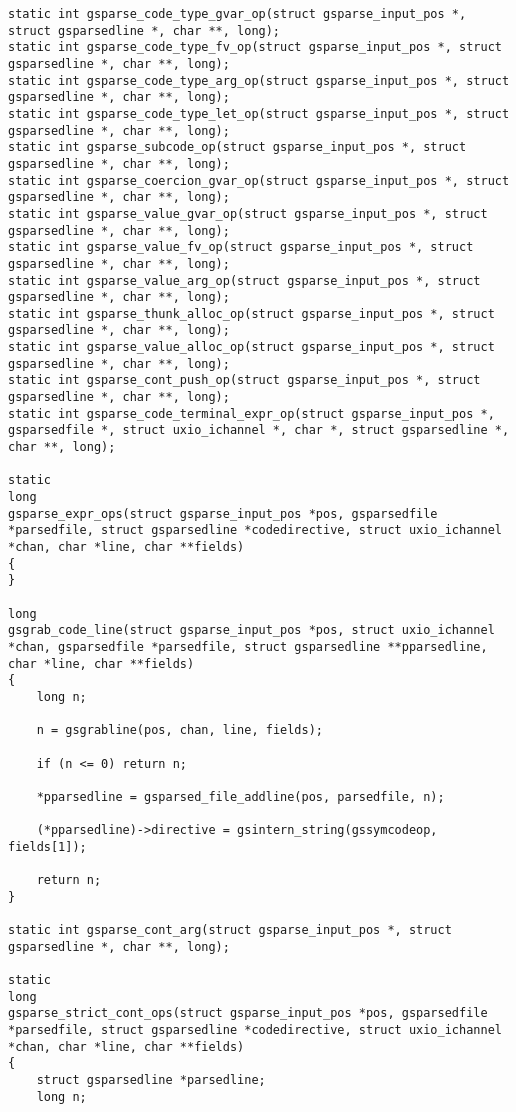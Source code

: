 \documentclass{report}
\begin{document}
\begin{verbatim}
static int gsparse_code_type_gvar_op(struct gsparse_input_pos *, struct gsparsedline *, char **, long);
static int gsparse_code_type_fv_op(struct gsparse_input_pos *, struct gsparsedline *, char **, long);
static int gsparse_code_type_arg_op(struct gsparse_input_pos *, struct gsparsedline *, char **, long);
static int gsparse_code_type_let_op(struct gsparse_input_pos *, struct gsparsedline *, char **, long);
static int gsparse_subcode_op(struct gsparse_input_pos *, struct gsparsedline *, char **, long);
static int gsparse_coercion_gvar_op(struct gsparse_input_pos *, struct gsparsedline *, char **, long);
static int gsparse_value_gvar_op(struct gsparse_input_pos *, struct gsparsedline *, char **, long);
static int gsparse_value_fv_op(struct gsparse_input_pos *, struct gsparsedline *, char **, long);
static int gsparse_value_arg_op(struct gsparse_input_pos *, struct gsparsedline *, char **, long);
static int gsparse_thunk_alloc_op(struct gsparse_input_pos *, struct gsparsedline *, char **, long);
static int gsparse_value_alloc_op(struct gsparse_input_pos *, struct gsparsedline *, char **, long);
static int gsparse_cont_push_op(struct gsparse_input_pos *, struct gsparsedline *, char **, long);
static int gsparse_code_terminal_expr_op(struct gsparse_input_pos *, gsparsedfile *, struct uxio_ichannel *, char *, struct gsparsedline *, char **, long);

static
long
gsparse_expr_ops(struct gsparse_input_pos *pos, gsparsedfile *parsedfile, struct gsparsedline *codedirective, struct uxio_ichannel *chan, char *line, char **fields)
{
}

long
gsgrab_code_line(struct gsparse_input_pos *pos, struct uxio_ichannel *chan, gsparsedfile *parsedfile, struct gsparsedline **pparsedline, char *line, char **fields)
{
    long n;

    n = gsgrabline(pos, chan, line, fields);

    if (n <= 0) return n;

    *pparsedline = gsparsed_file_addline(pos, parsedfile, n);

    (*pparsedline)->directive = gsintern_string(gssymcodeop, fields[1]);

    return n;
}

static int gsparse_cont_arg(struct gsparse_input_pos *, struct gsparsedline *, char **, long);

static
long
gsparse_strict_cont_ops(struct gsparse_input_pos *pos, gsparsedfile *parsedfile, struct gsparsedline *codedirective, struct uxio_ichannel *chan, char *line, char **fields)
{
    struct gsparsedline *parsedline;
    long n;


\end{verbatim}
\end{document}
